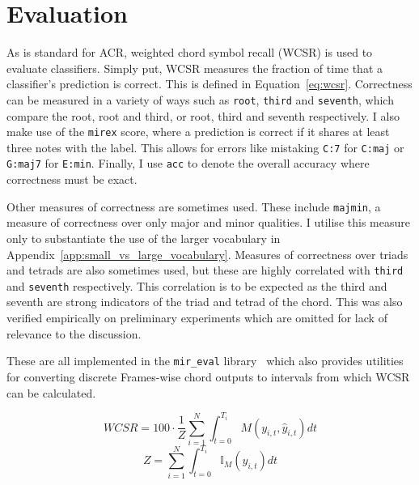 
\section{Evaluation}\label{sec:evaluation}

As is standard for ACR, weighted chord symbol recall (WCSR) is used to evaluate classifiers. Simply put, WCSR measures the fraction of time that a classifier's prediction is correct. This is defined in Equation~\ref{eq:wcsr}. Correctness can be measured in a variety of ways such as \texttt{root}, \texttt{third} and \texttt{seventh}, which compare the root, root and third, or root, third and seventh respectively. I also make use of the \texttt{mirex} score, where a prediction is correct if it shares at least three notes with the label. This allows for errors like mistaking \texttt{C:7} for \texttt{C:maj} or \texttt{G:maj7} for \texttt{E:min}. Finally, I use \texttt{acc} to denote the overall accuracy where correctness must be exact.

Other measures of correctness are sometimes used. These include \texttt{majmin}, a measure of correctness over only major and minor qualities. I utilise this measure only to substantiate the use of the larger vocabulary in Appendix~\ref{app:small_vs_large_vocabulary}. Measures of correctness over triads and tetrads are also sometimes used, but these are highly correlated with \texttt{third} and \texttt{seventh} respectively. This correlation is to be expected as the third and seventh are strong indicators of the triad and tetrad of the chord. This was also verified empirically on preliminary experiments which are omitted for lack of relevance to the discussion.

These are all implemented in the \texttt{mir\_eval} library~\citep{mir_eval} which also provides utilities for converting discrete Frames-wise chord outputs to intervals from which WCSR can be calculated.

\begin{equation}\label{eq:wcsr}
    WCSR = 100\cdot\frac{1}{Z}\sum_{i=1}^{N} \int_{t=0}^{T_i} M(y_{i,t},\hat{y}_{i,t}) dt
\end{equation}
\begin{equation}
    Z = \sum_{i=1}^{N} \int_{t=0}^{T_i} \mathbb{I}_M(y_{i,t}) dt
\end{equation}

